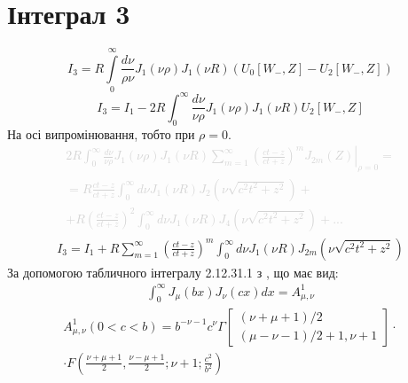 \section{Інтеграл 3}

\begin{equation} 
I_3 = R \int \limits_{0}^{\infty} \frac{d \nu}{\rho \nu} 
J_1(\nu \rho) J_1(\nu R) (U_0[ W_-, Z ] - U_2[ W_-, Z ])
\end{equation}
%
\begin{equation} \label{eq:intergal3}
I_3 = I_1 - 2 R \int_{0}^{\infty} \frac{d \nu}{\nu \rho} 
J_1(\nu \rho) J_1(\nu R) U_2[ W_-, Z ]
\end{equation}
%
На осі випромінювання, тобто при $ \rho = 0 $. 
%
\textcolor{lightgray}{ \begin{equation*} \begin{aligned}
\left. 2 R \int_{0}^{\infty} \frac{d \nu}{\nu \rho} 
J_1(\nu \rho) J_1(\nu R) \sum_{m=1}^{\infty} \left( 
\frac{ct - z}{ct + z} \right)^m J_{2m} (Z) 
\right|_{\rho = 0} = \\ = R \frac{ct - z}{ct + z} \int_{0}^{\infty} 
d \nu J_1(\nu R) J_2 (\nu \sqrt{c^2t^2 + z^2}) + \\ 
+ R \left( \frac{ct - z}{ct + z} \right)^2 
\int_{0}^{\infty} d \nu J_1(\nu R) J_4 (\nu \sqrt{c^2t^2 + z^2}) + ...
\end{aligned} \end{equation*} }
%
\begin{equation*} \begin{aligned}
I_3 = I_1 + R \sum_{m=1}^{\infty} \left( \frac{ct - z}{ct + z} \right)^m 
\int_{0}^{\infty} d \nu J_1(\nu R) J_{2m} (\nu \sqrt{c^2t^2 + z^2})
\end{aligned} \end{equation*}
%
За допомогою табличного інтегралу 2.12.31.1 з 
\cite[ст. 209]{SpecFunc1983}, що має вид:
%
\begin{equation*} \begin{aligned}
\int_0^\infty J_\mu (bx) J_\nu (cx) dx = A_{\mu,\nu}^1
\end{aligned} \end{equation*}
%
\begin{equation*} \begin{aligned}
A_{\mu,\nu}^1 \left( 0 < c < b \right) = b^{-\nu-1} c^{\nu} 
\Gamma \left[ \begin{array}{l} 
(\nu+\mu+1)/2 \\ (\mu-\nu-1)/2 + 1, \nu + 1 \end{array} \right] \cdot
\\ \cdot F \left(  \frac{\nu+\mu+1}{2}, \frac{\nu-\mu+1}{2}; 
\nu+1; \frac{c^2}{b^2} \right)
\end{aligned} \end{equation*}
